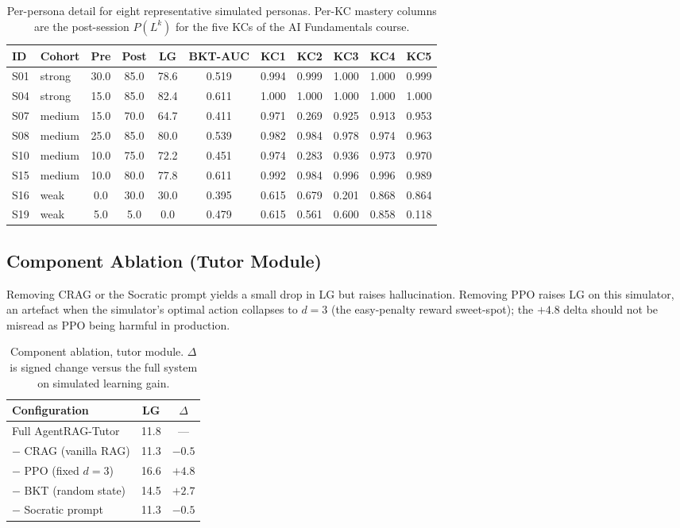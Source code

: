 \documentclass[conference]{IEEEtran}
\begin{document}
\begin{table}[!t]
\caption{Per-persona detail for eight representative simulated
personas. Per-KC mastery columns are the post-session $P(L^k)$ for
the five KCs of the AI Fundamentals course.}
\label{tab:personas}
\centering
\footnotesize
\setlength{\tabcolsep}{6pt}
\begin{tabular}{l l c c c c c c c c c}
\toprule
ID & Cohort & Pre & Post & LG & BKT-AUC & KC1 & KC2 & KC3 & KC4 & KC5 \\
\midrule
S01 & strong & 30.0 & 85.0 & 78.6 & 0.519 & 0.994 & 0.999 & 1.000 & 1.000 & 0.999 \\
S04 & strong & 15.0 & 85.0 & 82.4 & 0.611 & 1.000 & 1.000 & 1.000 & 1.000 & 1.000 \\
S07 & medium & 15.0 & 70.0 & 64.7 & 0.411 & 0.971 & 0.269 & 0.925 & 0.913 & 0.953 \\
S08 & medium & 25.0 & 85.0 & 80.0 & 0.539 & 0.982 & 0.984 & 0.978 & 0.974 & 0.963 \\
S10 & medium & 10.0 & 75.0 & 72.2 & 0.451 & 0.974 & 0.283 & 0.936 & 0.973 & 0.970 \\
S15 & medium & 10.0 & 80.0 & 77.8 & 0.611 & 0.992 & 0.984 & 0.996 & 0.996 & 0.989 \\
S16 & weak   &  0.0 & 30.0 & 30.0 & 0.395 & 0.615 & 0.679 & 0.201 & 0.868 & 0.864 \\
S19 & weak   &  5.0 &  5.0 &  0.0 & 0.479 & 0.615 & 0.561 & 0.600 & 0.858 & 0.118 \\
\bottomrule
\end{tabular}
\end{table}

\subsection{Component Ablation (Tutor Module)}
Removing CRAG or the Socratic prompt yields a small drop in LG but
raises hallucination. Removing PPO raises LG on this simulator, an
artefact when the simulator's optimal action collapses to $d=3$
(the easy-penalty reward sweet-spot); the $+4.8$ delta should not
be misread as PPO being harmful in production.

\begin{table}[H]
\caption{Component ablation, tutor module. $\Delta$ is signed change
versus the full system on simulated learning gain.}
\label{tab:ablation}
\centering
\footnotesize
\setlength{\tabcolsep}{6pt}
\begin{tabular}{l c c}
\toprule
Configuration & LG & $\Delta$ \\
\midrule
Full AgentRAG-Tutor    & 11.8 & --- \\
$-$ CRAG (vanilla RAG) & 11.3 & $-0.5$ \\
$-$ PPO (fixed $d{=}3$)& 16.6 & $+4.8$ \\
$-$ BKT (random state) & 14.5 & $+2.7$ \\
$-$ Socratic prompt    & 11.3 & $-0.5$ \\
\bottomrule
\end{tabular}
\end{table}
\end{document}
